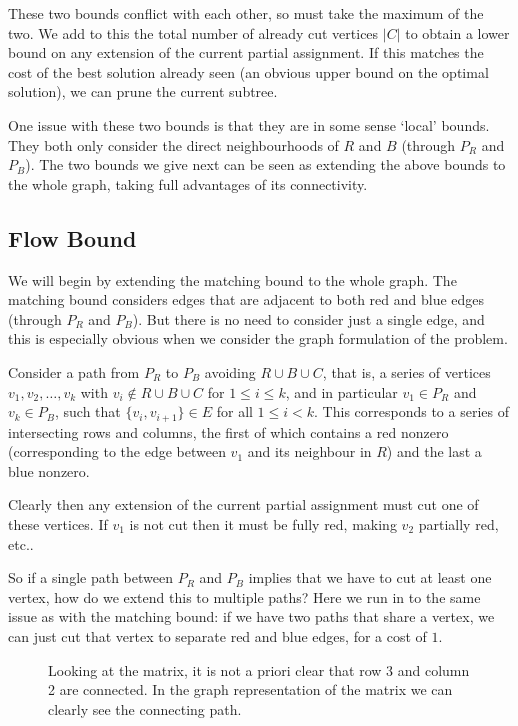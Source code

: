 	These two bounds conflict with each other, so must take the maximum of the
	two. We add to this the total number of already cut vertices $|C|$ to
	obtain a lower bound on any extension of the current partial assignment.
	If this matches the cost of the best solution already seen (an obvious
	upper bound on the optimal solution), we can prune the current subtree.

	One issue with these two bounds is that they are in some sense `local'
	bounds. They both only consider the direct neighbourhoods of $R$ and $B$
	(through $P_R$ and $P_B$). The two bounds we give next can be seen as
	extending the above bounds to the whole graph, taking full advantages of
	its connectivity.

	\subsection{Flow Bound}

	We will begin by extending the matching bound to the whole graph. The
	matching bound considers edges that are adjacent to both red and blue
	edges (through $P_R$ and $P_B$). But there is no need to consider just
	a single edge, and this is especially obvious when we consider the graph
	formulation of the problem.

	Consider a path from $P_R$ to $P_B$ avoiding $R \cup B \cup C$, that is,
	a series of vertices $v_1, v_2, \dots, v_k$ with
	$v_i \not\in R\cup B\cup C$ for $1 \leq i\leq k$,
	and in particular $v_1 \in P_R$ and $v_k \in P_B$,
	such that $\{v_i, v_{i+1}\} \in E$ for all $1 \leq i < k$. This
	corresponds to a series of intersecting rows and columns, the first of
	which contains a red nonzero (corresponding to the edge between $v_1$ and
	its neighbour in $R$) and the last a blue nonzero.

	Clearly then any extension of the current partial assignment must cut one
	of these vertices. If $v_1$ is not cut then it must be fully red, making
	$v_2$ partially red, etc..

	So if a single path between $P_R$ and $P_B$ implies that we have to cut at
	least one vertex, how do we extend this to multiple paths? Here we run in
	to the same issue as with the matching bound: if we have two paths that
	share a vertex, we can just cut that vertex to separate red and blue edges,
	for a cost of $1$.

	\begin{figure}[h]
		
		\centering
		\label{fig-flow}
		\caption{Looking at the matrix, it is not a priori clear that row 3
			and column 2 are connected. In the graph representation of the
			matrix we can clearly see the connecting path.}
	\end{figure}


